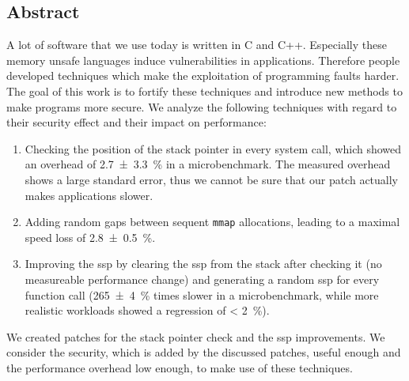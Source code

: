 \newpage
\vspace*{3.5cm}
\begin{center}
\begin{minipage}{12.5cm}
\section*{Abstract}
A lot of software that we use today is written in C and C++. Especially these memory unsafe languages induce vulnerabilities in applications. Therefore people developed techniques which make the exploitation of programming faults harder. The goal of this work is to fortify these techniques and introduce new methods to make programs more secure. We analyze the following techniques with regard to their security effect and their impact on performance:
\begin{enumerate}
	\item Checking the position of the stack pointer in every system call, which showed an overhead of \SI{2.7 \pm 3.3}{\percent} in a microbenchmark. The measured overhead shows a large standard error, thus we cannot be sure that our patch actually makes applications slower.
	\item Adding random gaps between sequent \texttt{mmap} allocations, leading to a maximal speed loss of \SI{2.8 \pm 0.5}{\percent}.
	\item Improving the \gls{ssp} by clearing the \gls{ssp} from the stack after checking it (no measureable performance change) and generating a random \gls{ssp} for every function call (\SI{265 \pm 4}{\percent} times slower in a microbenchmark, while more realistic workloads showed a regression of \SI{< 2}{\percent}).
\end{enumerate}

We created patches for the stack pointer check and the \gls{ssp} improvements. We consider the security, which is added by the discussed patches, useful enough and the performance overhead low enough, to make use of these techniques.

\end{minipage}
\end{center}



